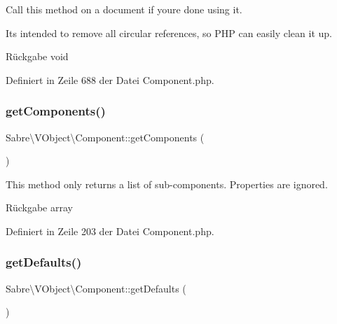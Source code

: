 Call this method on a document if you\textquotesingle{}re done using it.

It\textquotesingle{}s intended to remove all circular references, so P\+HP can easily clean it up.

\begin{DoxyReturn}{Rückgabe}
void 
\end{DoxyReturn}


Definiert in Zeile 688 der Datei Component.\+php.

\mbox{\label{class_sabre_1_1_v_object_1_1_component_aaae7ae26cf94feae68a27a6fdab6cdc9}} 
\subsubsection{\texorpdfstring{get\+Components()}{getComponents()}}
{\footnotesize\ttfamily Sabre\textbackslash{}\+V\+Object\textbackslash{}\+Component\+::get\+Components (\begin{DoxyParamCaption}{ }\end{DoxyParamCaption})}

This method only returns a list of sub-\/components. Properties are ignored.

\begin{DoxyReturn}{Rückgabe}
array 
\end{DoxyReturn}


Definiert in Zeile 203 der Datei Component.\+php.

\mbox{\label{class_sabre_1_1_v_object_1_1_component_aea29b548a301df10fb87bd951dff4120}} 
\subsubsection{\texorpdfstring{get\+Defaults()}{getDefaults()}}
{\footnotesize\ttfamily Sabre\textbackslash{}\+V\+Object\textbackslash{}\+Component\+::get\+Defaults (\begin{DoxyParamCaption}{ }\end{DoxyParamCaption})\hspace{0.3cm}{\ttfamily [protected]}}

